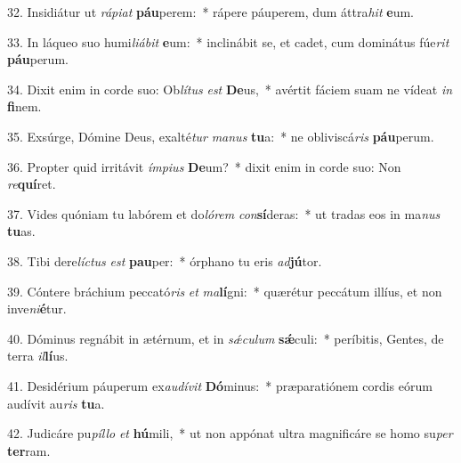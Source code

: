 32. Insidiátur ut \textit{rá}\textit{pi}\textit{at} \textbf{páu}perem:~*  rápere páuperem, dum áttra\textit{hit} \textbf{e}um.\

33. In láqueo suo humi\textit{li}\textit{á}\textit{bit} \textbf{e}um:~*  inclinábit se, et cadet, cum dominátus fúe\textit{rit} \textbf{páu}perum.\

34. Dixit enim in corde suo: Ob\textit{lí}\textit{tus} \textit{est} \textbf{De}us,~*  avértit fáciem suam ne vídeat \textit{in} \textbf{fi}nem.\

35. Exsúrge, Dómine Deus, exalté\textit{tur} \textit{ma}\textit{nus} \textbf{tu}a:~*  ne obliviscá\textit{ris} \textbf{páu}perum.\

36. Propter quid irritávit \textit{ím}\textit{pi}\textit{us} \textbf{De}um?~*  dixit enim in corde suo: Non \textit{re}\textbf{quí}ret.\

37. Vides quóniam tu labórem et do\textit{ló}\textit{rem} \textit{con}\textbf{sí}deras:~*  ut tradas eos in ma\textit{nus} \textbf{tu}as.\

38. Tibi dere\textit{líc}\textit{tus} \textit{est} \textbf{pau}per:~*  órphano tu eris \textit{ad}\textbf{jú}tor.\

39. Cóntere bráchium peccató\textit{ris} \textit{et} \textit{ma}\textbf{lí}gni:~*  quærétur peccátum illíus, et non inve\textit{ni}\textbf{é}tur.\

40. Dóminus regnábit in ætérnum, et in \textit{sǽ}\textit{cu}\textit{lum} \textbf{sǽ}culi:~*  períbitis, Gentes, de terra \textit{il}\textbf{lí}us.\

41. Desidérium páuperum ex\textit{au}\textit{dí}\textit{vit} \textbf{Dó}minus:~*  præparatiónem cordis eórum audívit au\textit{ris} \textbf{tu}a.\

42. Judicáre pu\textit{píl}\textit{lo} \textit{et} \textbf{hú}mili,~*  ut non appónat ultra magnificáre se homo su\textit{per} \textbf{ter}ram.\

